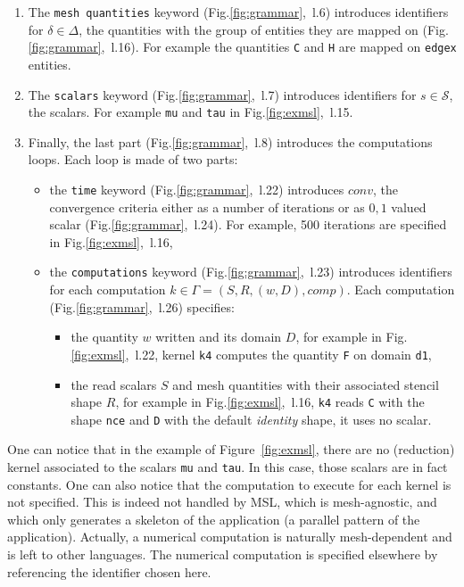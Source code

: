 \begin{enumerate}
\item The \texttt{mesh quantities} keyword (Fig.\ref{fig:grammar},~l.6) introduces identifiers for $\delta\in\Delta$, the quantities with the group of entities they are mapped on (Fig.\ref{fig:grammar},~l.16). For example the quantities \texttt{C} and \texttt{H} are mapped on \texttt{edgex} entities.

\item The \texttt{scalars} keyword (Fig.\ref{fig:grammar},~l.7) introduces identifiers for $s\in\mathcal{S}$, the scalars. For example \texttt{mu} and \texttt{tau} in Fig.\ref{fig:exmsl},~l.15. 

\item Finally, the last part (Fig.\ref{fig:grammar},~l.8) introduces the computations loops. Each loop is made of two parts:
\begin{itemize}
\item the \texttt{time} keyword (Fig.\ref{fig:grammar},~l.22) introduces $conv$, the convergence criteria either as a number of iterations or as ${0,1}$ valued scalar (Fig.\ref{fig:grammar},~l.24). For example, 500 iterations are specified in Fig.\ref{fig:exmsl},~l.16,
\item the \texttt{computations} keyword (Fig.\ref{fig:grammar},~l.23) introduces identifiers for each computation $k\in\Gamma=(S,R,(w,D),comp)$. Each computation (Fig.\ref{fig:grammar},~l.26) specifies:
\begin{itemize}
 \item the quantity $w$ written and its domain $D$, for example in Fig.\ref{fig:exmsl},~l.22, kernel \texttt{k4} computes the quantity \texttt{F} on domain \texttt{d1},
 \item the read scalars $S$ and mesh quantities with their associated stencil shape $R$, for example in Fig.\ref{fig:exmsl},~l.16, \texttt{k4} reads \texttt{C} with the shape \texttt{nce} and \texttt{D} with the default \textit{identity} shape, it uses no scalar.
 \end{itemize}
\end{itemize}
\end{enumerate}

One can notice that in the example of Figure~\ref{fig:exmsl}, there are no (reduction) kernel associated to the scalars \texttt{mu} and \texttt{tau}.
In this case, those scalars are in fact constants.
One can also notice that the computation to execute for each kernel is not specified.
This is indeed not handled by MSL, which is mesh-agnostic, and which only generates a skeleton of the application (a parallel pattern of the application). Actually, a numerical computation is naturally mesh-dependent and is left to other languages. The numerical computation is specified elsewhere by referencing the identifier chosen here.

